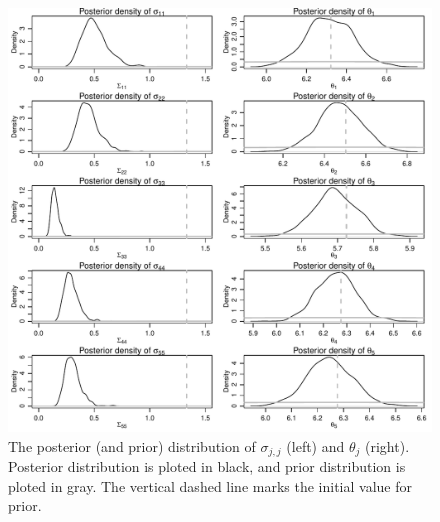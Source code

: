 \documentclass[12pt]{article}
\begin{document}
\begin{figure}[htbp]
	\centering
	\includegraphics[width=.85\textwidth]{pic/0.10/Posterior_vs_Prior.pdf}
	\caption{The posterior (and prior) distribution of $\sigma_{j, j}$ (left) and $\theta_j$ (right). Posterior distribution is ploted in black, and prior distribution is ploted in gray. The vertical dashed line marks the initial value for prior.}
	\label{fig:0.1-Posterior_vs_Prior}
\end{figure}
\newpage
\end{document}
